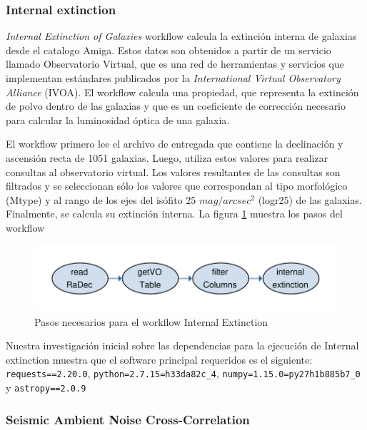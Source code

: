 \subsubsection{Internal extinction}

\textit{Internal Extinction of Galaxies} workflow calcula la extinción interna de galaxias desde el catalogo Amiga. Estos datos son obtenidos a partir de un servicio llamado Observatorio Virtual, que es una red de herramientas y servicios que implementan estándares publicados por la \textit{International Virtual Observatory Alliance} (IVOA). El workflow calcula una propiedad, que representa la extinción de polvo dentro de las galaxias y que es un coeficiente de corrección necesario para calcular la luminosidad óptica de una galaxia.

El workflow primero lee el archivo de entregada que contiene la declinación y ascensión recta de 1051 galaxias. Luego, utiliza estos valores para realizar consultas al observatorio virtual. Los valores resultantes de las consultas son filtrados y se seleccionan sólo los valores que correspondan al tipo morfológico (Mtype) y al rango de los ejes del isófito 25 $mag/arcsec^{2}$ (logr25) de las galaxias. Finalmente, se calcula su extinción interna. La figura \ref{fig:internal} muestra los pasos del workflow

\begin{figure}[t]
\centering
\includegraphics[width=.8\textwidth]{Figures/internal-extinction}
\caption[Representación workflow: Internal Extinction]{Pasos necesarios para el workflow Internal Extinction}\label{fig:internal}
\end{figure}

Nuestra investigación inicial sobre las dependencias para la ejecución de Internal extinction muestra que el software principal requeridos es el siguiente:  \verb|requests==2.20.0|, \verb|python=2.7.15=h33da82c_4|, \verb|numpy=1.15.0=py27h1b885b7_0| y \verb|astropy==2.0.9|



\subsubsection{Seismic Ambient Noise Cross-Correlation}


